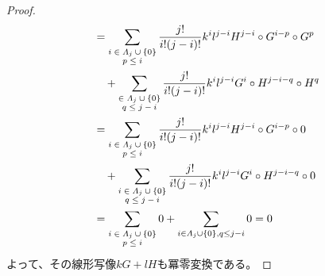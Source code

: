\documentclass[dvipdfmx]{jsarticle}
\begin{document}
\begin{proof}
\begin{align*}
&= \sum_{\scriptsize \begin{matrix} i \in \varLambda_{j} \cup \left\{ 0 \right\} \\p \leq i \\\end{matrix}} {\frac{j!}{i!(j - i)!}k^{i}l^{j - i}H^{j - i} \circ G^{i - p} \circ G^{p}} \\
&\quad + \sum_{\scriptsize \begin{matrix}  \in \varLambda_{j} \cup \left\{ 0 \right\} \\q \leq j - i \\\end{matrix}} {\frac{j!}{i!(j - i)!}k^{i}l^{j - i}G^{i} \circ H^{j - i - q} \circ H^{q}} \\
&= \sum_{\scriptsize \begin{matrix} i \in \varLambda_{j} \cup \left\{ 0 \right\} \\p \leq i \\\end{matrix}} {\frac{j!}{i!(j - i)!}k^{i}l^{j - i}H^{j - i} \circ G^{i - p} \circ 0} \\
&\quad + \sum_{\scriptsize \begin{matrix} i \in \varLambda_{j} \cup \left\{ 0 \right\} \\q \leq j - i \\\end{matrix}} {\frac{j!}{i!(j - i)!}k^{i}l^{j - i}G^{i} \circ H^{j - i - q} \circ 0} \\
&= \sum_{\scriptsize \begin{matrix} i \in \varLambda_{j} \cup \left\{ 0 \right\} \\ p \leq i \\\end{matrix}} 0 + \sum_{i \in \varLambda_{j} \cup \left\{ 0 \right\} ,q \leq j - i } 0 = 0
\end{align*}
よって、その線形写像$kG + lH$も冪零変換である。
\end{proof}
\end{document}

